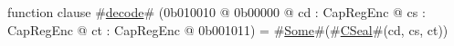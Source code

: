 function clause #\hyperref[zdecode]{decode}# (0b010010 @ 0b00000 @ cd : CapRegEnc @ cs : CapRegEnc @ ct : CapRegEnc @ 0b001011) = #\hyperref[zSome]{Some}#(#\hyperref[zCSeal]{CSeal}#(cd, cs, ct))
